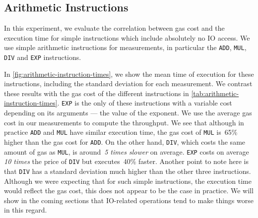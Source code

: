 \subsection{Arithmetic Instructions}
In this experiment, we evaluate the correlation between gas cost and the execution time for simple instructions which include absolutely no IO access. We use simple arithmetic instructions for measurements, in particular the \lstinline{ADD}, \lstinline{MUL}, \lstinline{DIV} and \lstinline{EXP} instructions.

In \autoref{fig:arithmetic-instruction-times}, we show the mean time of execution for these instructions, including the standard deviation for each measurement.
We contrast these results with the gas cost of the different instructions in \autoref{tab:arithmetic-instruction-times}.
\lstinline{EXP} is the only of these instructions with a variable cost depending on its arguments --- the value of the exponent. We use the average gas cost in our measurements to compute the throughput.
We see that although in practice \lstinline{ADD} and \lstinline{MUL} have similar execution time, the gas cost of \lstinline{MUL} is~65\% higher than the gas cost for \lstinline{ADD}.
On the other hand, \lstinline{DIV}, which costs the same amount of gas as \lstinline{MUL}, is around~\emph{5 times slower} on average. \lstinline{EXP} costs on average \emph{10 times} the price of \lstinline{DIV} but executes~40\% faster.
Another point to note here is that \lstinline{DIV} has a standard deviation much higher than the other three instructions.
Although we were expecting that for such simple instructions, the execution time would reflect the gas cost, this does not appear to be the case in practice.
We will show in the coming sections that IO-related operations tend to make things worse in this regard.


